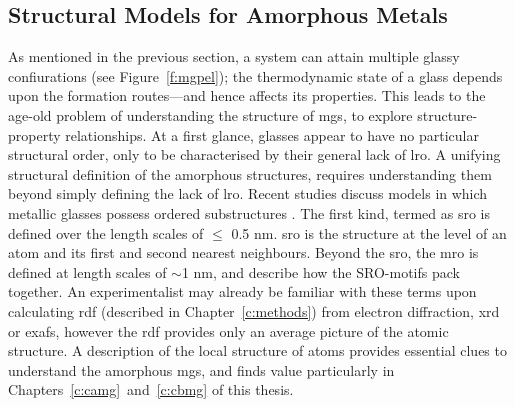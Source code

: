 \subsection{Structural Models for Amorphous Metals}\label{s:sro-mgs}
As mentioned in the previous section, a system can attain multiple glassy confiurations (see Figure~\ref{f:mgpel}); the thermodynamic state of a glass depends upon the formation routes---and hence affects its properties. This leads to the age-old problem of understanding the structure of \gls{mg}s, to explore structure-property relationships. At a first glance, glasses appear to have no particular structural order, only to be characterised by their general lack of \gls{lro}. A unifying structural definition of the amorphous structures, requires understanding them beyond simply defining the lack of \gls{lro}. Recent studies discuss models in which metallic glasses possess ordered substructures \cite{Sheng2006,Fukunaga2006,Greer2007}. The first kind, termed as \gls{sro} is defined over the length scales of $\leq$ 0.5 nm. \gls{sro} is the structure at the level of an atom and its first and second nearest neighbours. Beyond the \gls{sro}, the \gls{mro} is defined at length scales of $\sim$1 nm, and describe how the SRO-motifs pack together. An experimentalist may already be familiar with these terms upon calculating \gls{rdf} (described in Chapter~\ref{c:methods}) from electron diffraction, \gls{xrd} or \gls{exafs}, however the \gls{rdf} provides only an average 
picture of the atomic structure. A description of the local structure of atoms provides essential clues to understand the amorphous \gls{mg}s, and finds value particularly in Chapters~\ref{c:camg}~and~\ref{c:cbmg} of this thesis.  \par

